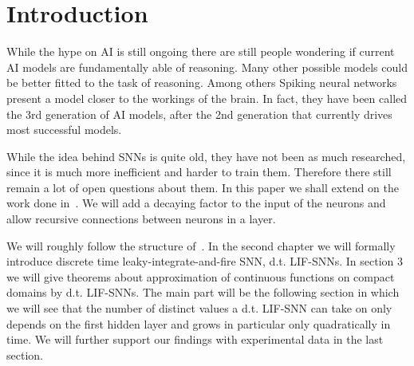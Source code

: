 \section{Introduction}
\label{ch:intro}

While the hype on AI is still ongoing there are still people wondering if current AI models are fundamentally able of reasoning. Many other possible models could be better fitted to the task of reasoning. Among others Spiking neural networks present a model closer to the workings of the brain. In fact, they have been called the 3rd generation of AI models, after the 2nd generation that currently drives most successful models.

While the idea behind SNNs is quite old, they have not been as much researched, since it is much more inefficient and harder to train them. Therefore there still remain a lot of open questions about them.
In this paper we shall extend on the work done in~\cite{nguyen2025timespikeunderstandingrepresentational}. We will add a decaying factor to the input of the neurons and allow recursive connections between neurons in a layer.

We will roughly follow the structure of~\cite{nguyen2025timespikeunderstandingrepresentational}. In the second chapter we will formally introduce discrete time leaky-integrate-and-fire SNN, d.t. LIF-SNNs. In section 3 we will give theorems about approximation of continuous functions on compact domains by d.t. LIF-SNNs.
The main part will be the following section in which we will see that the number of distinct values a d.t. LIF-SNN can take on only depends on the first hidden layer and grows in particular only quadratically in time. We will further support our findings with experimental data in the last section.
